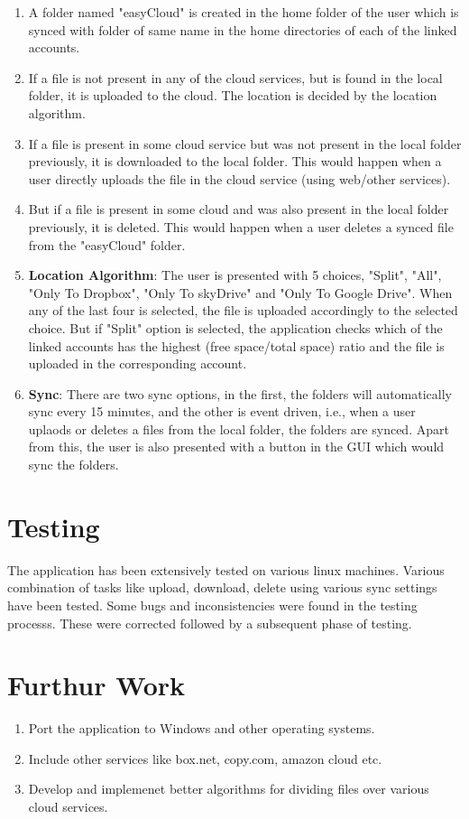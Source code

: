 \documentclass{article}
\begin{document}
\begin{enumerate}
\item A folder named "easyCloud" is created in the home folder of the user which is synced with folder of same name in the home directories of each of the linked accounts.
\item If a file is not present in any of the cloud services, but is found in the local folder, it is uploaded to the cloud. The location is decided by the location algorithm.
\item If a file is present in some cloud service but was not present in the local folder previously, it is downloaded to the local folder. This would happen when a user directly uploads the file in the cloud service (using web/other services).
\item But if a file is present in some cloud and was also present in the local folder previously, it is deleted. This would happen when a user deletes a synced file from the "easyCloud" folder.
\item {\bf Location Algorithm}: The user is presented with 5 choices, "Split", "All", "Only To Dropbox", "Only To skyDrive" and "Only To Google Drive". When any of the last four is selected, the file is uploaded accordingly to the selected choice. But if "Split" option is selected, the application checks which of the linked accounts has the highest (free space/total space) ratio and the file is uploaded in the corresponding account.
\item {\bf Sync}: There are two sync options, in the first, the folders will automatically sync every 15 minutes, and the other is event driven, i.e., when a user uplaods or deletes a files from the local folder, the folders are synced. Apart from this, the user is also presented with a button in the GUI which would sync the folders. 
\end{enumerate}

\section{Testing}
The application has been extensively tested on various linux machines. Various combination of tasks like upload, download, delete using various sync settings have been tested.
Some bugs and inconsistencies were found in the testing processs. These were corrected followed by a subsequent phase of testing.

\section{Furthur Work}
\begin{enumerate}
\item Port the application to Windows and other operating systems.
\item Include other services like box.net, copy.com, amazon cloud etc. 
\item Develop and implemenet better algorithms for dividing files over various cloud services.
\end{enumerate}
\end{document}
